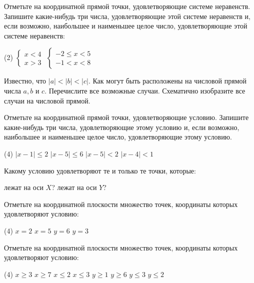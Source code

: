 \begin{class}[number=3]
	\begin{listofex}
		\item Отметьте на координатной прямой точки, удовлетворяющие системе неравенств. Запишите какие-нибудь три числа, удовлетворяющие этой системе неравенств и, если возможно, наибольшее и наименьшее целое число, удовлетворяющие этой системе неравенств:
		\begin{tasks}(2)
			\task \( \begin{cases} x<4 \\ x>3 \end{cases} \)
			\task \( \begin{cases} -2 \le x < 5 \\ -1 < x < 8 \end{cases} \)
		\end{tasks}
		\item Известно, что \( |a|<|b|<|c| \). Как могут быть расположены на числовой прямой числа \(a, b\) и \(c\). Перечислите все возможные случаи. Схематично изобразите все случаи на числовой прямой.
		\item Отметьте на координатной прямой точки, удовлетворяющие условию. Запишите какие-нибудь три числа, удовлетворяющие этому условию и, если возможно, наибольшее и наименьшее целое число, удовлетворяющие этому условию.
		\begin{tasks}(4)
			\task \( |x-1| \le 2 \)
			\task \( |x-5| \le 6 \)
			\task \( |x-5| < 2 \)
			\task \( |x-4| < 1 \)
		\end{tasks}
		\item Какому условию удовлетворяют те и только те точки, которые:
		\begin{tasks}
			\task лежат на оси \(X\)?
			\task лежат на оси \(Y\)?
		\end{tasks}
		\item Отметьте на координатной плоскости множество точек, координаты которых удовлетворяют условию:
		\begin{tasks}(4)
			\task \( x=2 \)
			\task \( x=5 \)
			\task \( y=6 \)
			\task \( y=3 \)
		\end{tasks}
		\item Отметьте на координатной плоскости множество точек, координаты которых удовлетворяют условию:
		\begin{tasks}(4)
			\task \( x \ge 3 \)
			\task \( x \ge 7 \)
			\task \( x \le 2 \)
			\task \( x \le 3 \)
			\task \( y \ge 1 \)
			\task \( y \ge 6 \)
			\task \( y \le 3 \)
			\task \( y \le 2 \)
		\end{tasks}
	\end{listofex}
\end{class}

